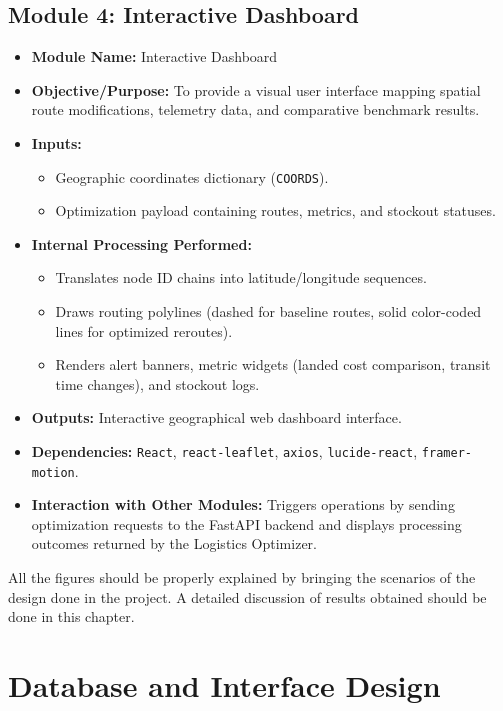 \subsection[Module 4: Interactive Dashboard]{Module 4: Interactive Dashboard}
\begin{itemize}
    \item \textbf{Module Name:} Interactive Dashboard
    \item \textbf{Objective/Purpose:} To provide a visual user interface mapping spatial route modifications, telemetry data, and comparative benchmark results.
    \item \textbf{Inputs:}
    \begin{itemize}
        \item Geographic coordinates dictionary (\texttt{COORDS}).
        \item Optimization payload containing routes, metrics, and stockout statuses.
    \end{itemize}
    \item \textbf{Internal Processing Performed:}
    \begin{itemize}
        \item Translates node ID chains into latitude/longitude sequences.
        \item Draws routing polylines (dashed for baseline routes, solid color-coded lines for optimized reroutes).
        \item Renders alert banners, metric widgets (landed cost comparison, transit time changes), and stockout logs.
    \end{itemize}
    \item \textbf{Outputs:} Interactive geographical web dashboard interface.
    \item \textbf{Dependencies:} \texttt{React}, \texttt{react-leaflet}, \texttt{axios}, \texttt{lucide-react}, \texttt{framer-motion}.
    \item \textbf{Interaction with Other Modules:} Triggers operations by sending optimization requests to the FastAPI backend and displays processing outcomes returned by the Logistics Optimizer.
\end{itemize}
All the figures should be properly explained by bringing the scenarios of the design done in the project. A detailed discussion of results obtained should be done in this chapter.

\section[Database and Interface Design]{Database and Interface Design}
